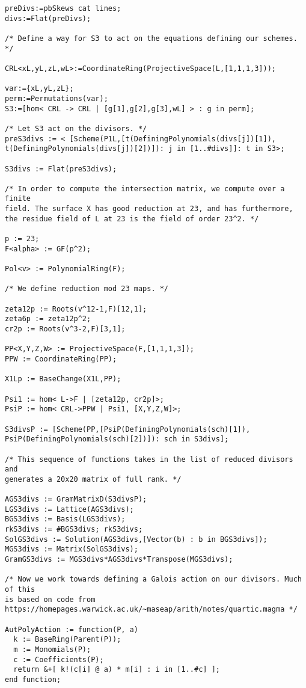 \documentclass[12pt,twoside]{reedthesis}
\theoremstyle{plain}
\theoremstyle{definition}
\theoremstyle{remark}
\begin{document}
\begin{appendices}
\begin{verbatim}
preDivs:=pbSkews cat lines;
divs:=Flat(preDivs);

/* Define a way for S3 to act on the equations defining our schemes. */

CRL<xL,yL,zL,wL>:=CoordinateRing(ProjectiveSpace(L,[1,1,1,3]));

var:={xL,yL,zL};
perm:=Permutations(var);
S3:=[hom< CRL -> CRL | [g[1],g[2],g[3],wL] > : g in perm];

/* Let S3 act on the divisors. */
preS3divs := < [Scheme(P1L,[t(DefiningPolynomials(divs[j])[1]), 
t(DefiningPolynomials(divs[j])[2])]): j in [1..#divs]]: t in S3>;

S3divs := Flat(preS3divs);

/* In order to compute the intersection matrix, we compute over a finite 
field. The surface X has good reduction at 23, and has furthermore, 
the residue field of L at 23 is the field of order 23^2. */

p := 23;
F<alpha> := GF(p^2);

Pol<v> := PolynomialRing(F);

/* We define reduction mod 23 maps. */

zeta12p := Roots(v^12-1,F)[12,1];
zeta6p := zeta12p^2;
cr2p := Roots(v^3-2,F)[3,1];

PP<X,Y,Z,W> := ProjectiveSpace(F,[1,1,1,3]);
PPW := CoordinateRing(PP);

X1Lp := BaseChange(X1L,PP);

Psi1 := hom< L->F | [zeta12p, cr2p]>;
PsiP := hom< CRL->PPW | Psi1, [X,Y,Z,W]>;

S3divsP := [Scheme(PP,[PsiP(DefiningPolynomials(sch)[1]),
PsiP(DefiningPolynomials(sch)[2])]): sch in S3divs];

/* This sequence of functions takes in the list of reduced divisors and 
generates a 20x20 matrix of full rank. */

AGS3divs := GramMatrixD(S3divsP);
LGS3divs := Lattice(AGS3divs);
BGS3divs := Basis(LGS3divs);
rkS3divs := #BGS3divs; rkS3divs;
SolGS3divs := Solution(AGS3divs,[Vector(b) : b in BGS3divs]);
MGS3divs := Matrix(SolGS3divs);
GramGS3divs := MGS3divs*AGS3divs*Transpose(MGS3divs);

/* Now we work towards defining a Galois action on our divisors. Much of this 
is based on code from 
https://homepages.warwick.ac.uk/~maseap/arith/notes/quartic.magma */

AutPolyAction := function(P, a)
  k := BaseRing(Parent(P));
  m := Monomials(P);
  c := Coefficients(P);
  return &+[ k!(c[i] @ a) * m[i] : i in [1..#c] ];
end function;


\end{verbatim}
\end{appendices}
\end{document}
